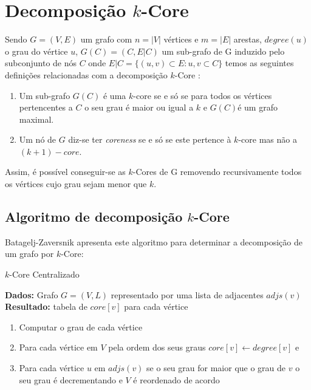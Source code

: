 \renewcommand{\algorithmicrequire}{\textbf{Dados: }}
\renewcommand{\algorithmicensure}{\textbf{Resultado: }}

\section{Decomposição $k$-Core}



Sendo $G = (V,E)$ um grafo com $n = |V|$ vértices e $m = |E|$ arestas, $degree(u)$ o grau do vértice $u$, $G(C) = (C, E|C)$ um sub-grafo de G induzido pelo subconjunto de nós $C$ onde $E|C = \{(u,v)\subset E : u,v \subset C\} $ temos as seguintes definições relacionadas com a decomposição $k$-Core \cite{kCoreDef}:


	\begin{enumerate}
		\item Um sub-grafo $G(C)$ é uma $k$-core se e só se para todos os vértices pertencentes a $C$ o seu grau é maior ou igual a $k$ e $G(C)$é um grafo maximal.
		\item Um nó de $G$ diz-se ter \textit{coreness} se e só se este pertence à $k$-core mas não a $(k+1)-core$.
	\end{enumerate}


Assim, é possível conseguir-se as $k$-Cores de G removendo recursivamente todos os vértices cujo grau sejam menor que $k$.

\subsection{Algoritmo de decomposição $k$-Core}
Batagelj-Zaversnik apresenta\cite{kCoreCen1,kCoreCen2} este algoritmo para determinar a decomposição de um grafo por $k$-Core:

\begin{algorithm}
\caption{$k$-Core Centralizado}
 \algorithmicrequire{Grafo $G = (V,L)$ representado por uma lista de adjacentes $adjs(v)$}
 \algorithmicensure{tabela de $core[v]$ para cada vértice}
\begin{enumerate}
	\item Computar o grau de cada vértice
	\item Para cada vértice em $V$ pela ordem dos seus graus $core[v] \gets degree[v]$ e
	\item Para cada vértice $u$ em $adjs(v)$ se o seu grau for maior que o grau de $v$ o seu grau é decrementando e $V$ é reordenado de acordo
\end{enumerate}
\end{algorithm}

